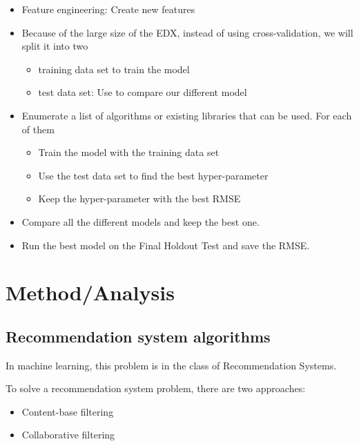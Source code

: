 \documentclass[
]{article}
\providecommand{\tightlist}{%
  \setlength{\itemsep}{0pt}\setlength{\parskip}{0pt}}
\begin{document}
\begin{itemize}
\item
  Feature engineering: Create new features
\item
  Because of the large size of the EDX, instead of using
  cross-validation, we will split it into two

  \begin{itemize}
  \tightlist
  \item
    training data set to train the model
  \item
    test data set: Use to compare our different model
  \end{itemize}
\item
  Enumerate a list of algorithms or existing libraries that can be used.
  For each of them

  \begin{itemize}
  \tightlist
  \item
    Train the model with the training data set
  \item
    Use the test data set to find the best hyper-parameter
  \item
    Keep the hyper-parameter with the best RMSE
  \end{itemize}
\item
  Compare all the different models and keep the best one.
\item
  Run the best model on the Final Holdout Test and save the RMSE.
\end{itemize}

\section{Method/Analysis}\label{methodanalysis}

\subsection{Recommendation system
algorithms}\label{recommendation-system-algorithms}

In machine learning, this problem is in the class of Recommendation
Systems.

To solve a recommendation system problem, there are two approaches:

\begin{itemize}
\tightlist
\item
  Content-base filtering
\item
  Collaborative filtering
\end{itemize}
\end{document}
